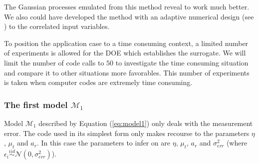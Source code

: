 \documentclass[soumission]{jsfds}
\begin{document}
The Gaussian processes emulated from this method reveal to work much better. We also could have developed the method with an adaptive numerical design (see \citep{damblin2018}) to the correlated input variables. \newline

To position the application case to a time consuming context, a limited number of experiments is allowed for the DOE which establishes the surrogate. We will limit the number of code calls to $50$ to investigate the time consuming situation and compare it to other situations more favorables. This number of experiments is taken when computer codes are extremely time consuming. \newline
%
%
%
%


%

\subsubsection{The first model $\mathcal{M}_1$}

Model $\mathcal{M}_1$ described by Equation (\ref{eq:model1}) only deals with the measurement error. The code used in its simplest form only makes recourse to the parameters $\eta$, $\mu_t$ and $a_r$. In this case the parameters to infer on are $\eta$, $\mu_t$, $a_r$ and $\sigma_{err}^2$ (where $\epsilon_i\overset{iid}{\sim}\mathcal{N}(0,\sigma_{err}^2)$).
\end{document}
